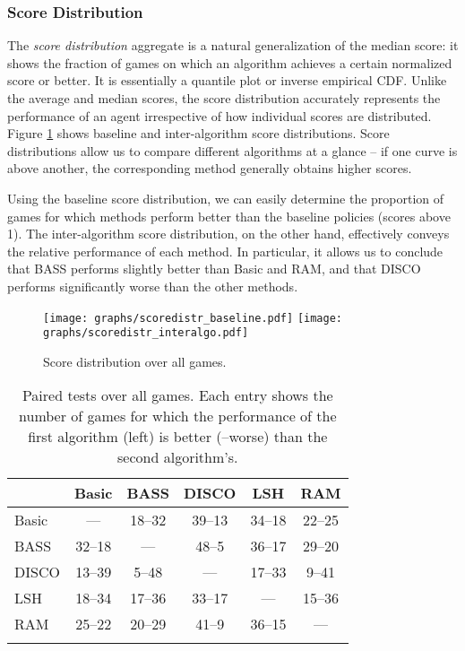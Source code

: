 \documentclass[twoside,11pt]{article}
\begin{document}
\subsubsection{Score Distribution}

The \emph{score distribution} aggregate is a natural generalization of the median score: it shows the fraction of games on which an algorithm achieves a certain normalized score or better.  It is essentially a quantile plot or inverse empirical CDF. Unlike the average and median scores, the score distribution accurately represents the performance of an agent irrespective of how individual scores are distributed. 
Figure \ref{fig:evaluation:score_distribution} shows baseline and inter-algorithm score distributions. 
Score distributions allow us to compare different algorithms at a glance -- if one curve is above another, the corresponding method generally obtains higher scores. 

Using the baseline score distribution, we can easily determine the proportion of games for which methods perform better than the baseline policies (scores above 1). The inter-algorithm score distribution, on the other hand, effectively conveys the relative performance of each method. 
In particular, it allows us to conclude that BASS performs slightly better than Basic and RAM, and that DISCO performs significantly worse than the other methods.


\begin{figure}
\begin{center}
\texttt{[image: graphs/scoredistr\_baseline.pdf]}
\vspace{-2ex}
\texttt{[image: graphs/scoredistr\_interalgo.pdf]}
\caption{Score distribution over all games.\label{fig:evaluation:score_distribution}}
\end{center}
\vspace{-4ex}
\end{figure}

\begin{table}
\begin{center}
\addtolength{\tabcolsep}{-0.8pt}
\small{
\begin{tabular}{@{}lccccc@{}}
\toprule
& Basic & BASS & DISCO & LSH & RAM \\
\midrule
Basic & --- & 18--32 & 39--13 & 34--18 & 22--25 \\ 
\hline
BASS & 32--18 & --- & 48--5 & 36--17 & 29--20 \\ 
\hline
DISCO & 13--39 & 5--48 & --- & 17--33 & 9--41 \\ 
\hline
LSH & 18--34 & 17--36 & 33--17 & --- & 15--36 \\ 
\hline
RAM & 25--22 & 20--29 & 41--9 & 36--15 & --- \\ 
\bottomrule
\vspace{-1.6em}
\end{tabular}
}
\caption{Paired tests over all games. Each entry shows the number of games for which the performance of the first algorithm (left) is better (--worse) than the second algorithm's.\label{table:paired_tests}}
\end{center}
\vspace{-2em}
\end{table}
\end{document}
